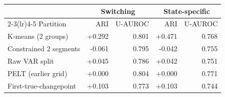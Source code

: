 \begin{tabular}{lrrrr}
\toprule
& \multicolumn{2}{c}{Switching} & \multicolumn{2}{c}{State-specific} \\
\cmidrule(lr){2-3}\cmidrule(lr){4-5}
Partition & ARI & U-AUROC & ARI & U-AUROC \\
\midrule
K-means (2 groups) & +0.292 & 0.801 & +0.471 & 0.768 \\
Constrained 2 segments & -0.061 & 0.795 & -0.042 & 0.755 \\
Raw VAR split & +0.045 & 0.786 & +0.042 & 0.751 \\
PELT (earlier grid) & +0.000 & 0.804 & +0.000 & 0.771 \\
First-true-changepoint & +0.103 & 0.773 & +0.103 & 0.744 \\
\bottomrule
\end{tabular}
